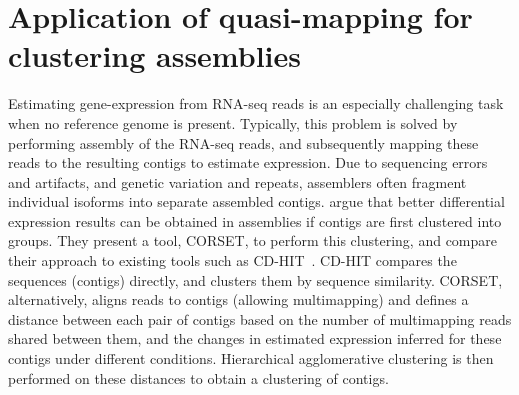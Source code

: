 \vspace{-0.1in}
\section{Application of quasi-mapping for clustering \denovo assemblies}
%
\begin{table}[h]
  \caption{Performance of CORSET, CD-HIT and \rapmap enabled clustering (R-CL) on yeast and human data}
  \label{tab:clust_perf}
\end{table}
%
Estimating gene-expression from RNA-seq reads is an especially challenging task when no reference genome is present. Typically, this problem is solved by performing \denovo assembly of the RNA-seq reads, and subsequently mapping these reads to the resulting contigs to estimate expression. Due to sequencing errors and artifacts, and genetic variation and repeats, \denovo assemblers often fragment individual isoforms into separate assembled contigs.  \citet{corset} argue that better differential expression results can be obtained in \denovo assemblies if contigs are first clustered into groups.  They present a tool, CORSET, to perform this clustering, and compare their approach to existing tools such as CD-HIT~\citep{fu2012cd}. CD-HIT compares the sequences (contigs) directly, and clusters them by sequence similarity. CORSET, alternatively, aligns reads to contigs (allowing multimapping) and defines a distance between each pair of contigs based on the number of multimapping reads shared between them, and the changes in estimated expression inferred for these contigs under different conditions. Hierarchical agglomerative clustering is then performed on these distances to obtain a clustering of contigs.

